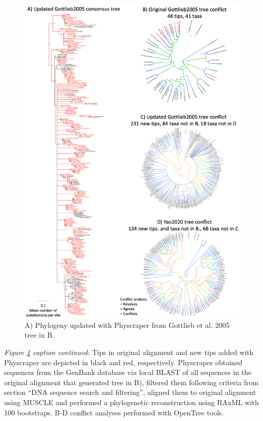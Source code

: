 \documentclass[]{article}
\begin{document}
\begin{figure}
\includegraphics[width=1\linewidth]{docs/figs/ilex-results} \caption{A) Phylogeny updated with Physcraper from Gottlieb et al. 2005 tree in B.}\label{fig:results}
\end{figure}

\newpage

\emph{Figure \ref{fig:results} caption continued}: Tips in original alignment and new tips added with Physcraper are depicted in black and red, respectively. Physcraper obtained sequences from the GenBank database via local BLAST of all sequences in the original alignment that generated tree in B), filtered them following criteria from section ``DNA sequence search and filtering'', aligned them to original alignment using MUSCLE and performed a phylogenetic reconstruction using RAxML with 100 bootstraps. B-D conflict analyses performed with OpenTree tools.
\end{document}
